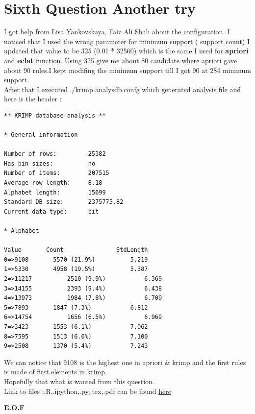 \documentclass{article}
\begin{document}
\section*{Sixth Question Another try}
I got help from Lisa Yankovskaya, Faiz Ali Shah about the configuration. I noticed that I used the wrong parameter for minimum support ( support count) I updated that value to be 325 (0.01 * 32560) which is the same I used for \textbf{apriori} and \textbf{eclat} function. Using 325 give me about 80 candidate where apriori gave about 90 rules.I kept modifing the minimum support till I got 90 at 284 minimum support.\\
After that I executed ./krimp analysdb.confg which generated analysis file and here is the header :
\begin{lstlisting}
** KRIMP database analysis **

* General information

Number of rows:			25382
Has bin sizes:			no
Number of items:		207515
Average row length:		8.18
Alphabet length:		15699
Standard DB size:		2375775.82
Current data type:		bit

* Alphabet

Value		Count				StdLength
0=>9108		  5570 (21.9%)			5.219
1=>5330		  4958 (19.5%)			5.387
2=>11217		  2510 (9.9%)			6.369
3=>14155		  2393 (9.4%)			6.438
4=>13973		  1984 (7.8%)			6.709
5=>7893		  1847 (7.3%)			6.812
6=>14754		  1656 (6.5%)			6.969
7=>3423		  1553 (6.1%)			7.062
8=>7595		  1513 (6.0%)			7.100
9=>2508		  1370 (5.4%)			7.243
\end{lstlisting}
We can notice that 9108 is the highest one in apriori \& krimp and the first rules is made of first elements in krimp.\\
Hopefully that what is wanted from this question.\\
Link to files :.R,.ipython,.py,.tex,.pdf can be found \href{https://github.com/aqeel13932/DM/tree/master/HW07}{here}
\begin{center}
\textbf{E.O.F}
\end{center}
\end{document}
